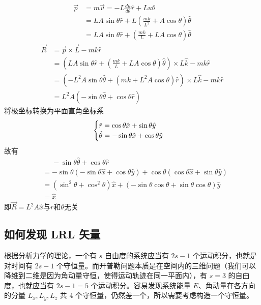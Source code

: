 \begin{align}
\vec p &= m \vec v = -L\frac{du}{d\theta}\hat r + Lu \hat \theta \\
&=L A \sin \theta \hat r + L \left(\frac{mk}{L^{2}} + A \cos \theta \right)\hat \theta \\
&=L A \sin \theta \hat r + \left(\frac{mk}{L} +L A \cos \theta \right)\hat \theta
\end{align}
\begin{align}
\vec R &= \vec p \times \vec L - mk \hat r \\
&=\left(L A \sin \theta \hat r + \left(\frac{mk}{L} +L A \cos \theta \right)\hat \theta \right) \times L \hat k -mk\hat r\\
&=\left(-L^{2} A \sin \theta \hat \theta + \left(mk +L^{2} A \cos \theta \right)\hat r \right) \times L \hat k -mk\hat r \\
&= L^{2}A\left(-\sin \theta \hat \theta+\cos \theta \hat r \right)
\end{align}
将极坐标转换为平面直角坐标系
\begin{equation}
\begin{cases}
$$\hat r = \cos \theta \hat{x} + \sin \theta \hat{y}\\
$$\hat \theta = -\sin \theta \hat{x} +\cos \theta \hat{y}\\
\end{cases}
\end{equation}
故有
\begin{align}
&\phantom{=} -\sin \theta \hat \theta+\cos \theta \hat r \\
&=-\sin \theta \left(-\sin \theta \hat{x} +\cos \theta \hat{y}\right)+ \cos \theta \left(\cos \theta \hat{x} + \sin \theta \hat{y} \right)\\
&= \left(\sin^{2}\theta + \cos^{2}\theta\right)\hat x + \left(-\sin \theta \cos \theta +\sin \theta \cos \theta \right)\hat y\\
&= \hat x
\end{align}
即$\vec R = L^{2}A \hat x$与$r$和$\theta$无关


\subsection{如何发现 LRL 矢量}
根据分析力学的理论，一个有 $s$ 自由度的系统应当有 $2s-1$ 个运动积分，也就是对时间有 $2s-1$ 个守恒量。而开普勒问题本质是在空间内的三维问题（我们可以降维到二维是因为角动量守恒，使得运动轨迹在同一平面内），有 $s=3$ 的自由度，也就应当有 $2s-1=5$ 个运动积分。容易发现系统能量 $E$、角动量在各方向的分量 $L_x, L_y, L_z$ 共 $4$ 个守恒量，仍然差一个，所以需要考虑构造一个守恒量。

